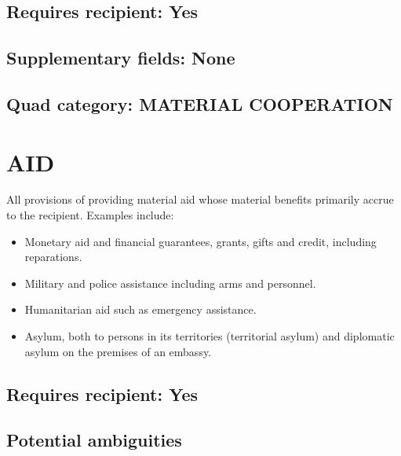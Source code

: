 \documentclass[11pt]{report}
\begin{document}
\subsection{Requires recipient: Yes}

\subsection{Supplementary fields: None}

\subsection{Quad category: MATERIAL COOPERATION}


\newpage

\section{AID}

All provisions of providing material aid whose material benefits primarily accrue to the recipient. Examples include:

\begin{itemize}

\item Monetary aid and financial guarantees, grants, gifts and credit, including reparations.

\item Military and police assistance including arms and personnel.

\item Humanitarian aid such as emergency assistance.

\item Asylum, both to persons in its territories (territorial asylum) and diplomatic asylum on the premises of an embassy.

\end{itemize}

\subsection{Requires recipient: Yes}

\subsection{Potential ambiguities}
\end{document}
